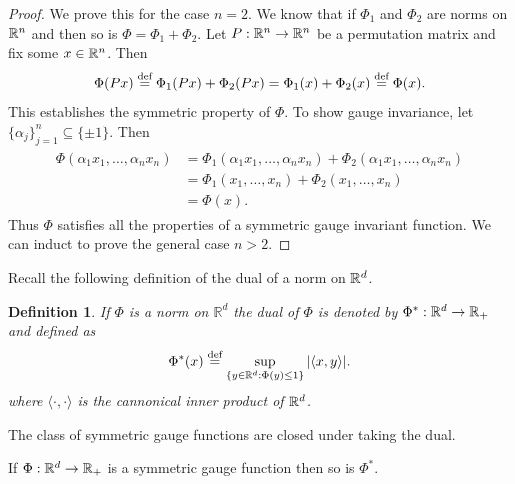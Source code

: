\documentclass[sn-nature]{sn-jnl}%
\theoremstyle{thmstyleone}%
\newtheorem{defn}{Definition}
\theoremstyle{thmstyletwo}%
\theoremstyle{thmstylethree}%
\begin{document}
\begin{proof}
    We prove this for the case $n=2$. We know that if $\Phi_1$ and $\Phi_2$ are norms on $\mathbb{R}^n$ and then so is $\Phi = \Phi_1 + \Phi_2$. Let $P: \mathbb{R}^n \to \mathbb{R}^n$ be a permutation matrix and fix some $x \in \mathbb{R}^n$. Then 
    \[
    \Phi(Px) \stackrel{\text{def}}{=} \Phi_1(Px) + \Phi_2(Px) = \Phi_1(x) + \Phi_2(x) \stackrel{\text{def}}{=} \Phi(x). 
    \]
    This establishes the symmetric property of $\Phi$.
    To show gauge invariance, let $\{\alpha_j\}_{j=1}^n \subseteq \{\pm 1\}$. Then
    \begin{align*}
        \begin{split}
            \Phi(\alpha_1 x_1, \ldots, \alpha_n x_n)  &=  \Phi_1(\alpha_1 x_1, \ldots, \alpha_n x_n) +  \Phi_2(\alpha_1 x_1, \ldots, \alpha_n x_n)
            \\&= \Phi_1(x_1, \ldots, x_n) + \Phi_2(x_1, \ldots, x_n) 
            \\& = \Phi(x).
        \end{split}
    \end{align*}
    Thus $\Phi$ satisfies all the properties of a symmetric gauge invariant function. We can induct to prove the general case $n > 2$.
\end{proof}

Recall the following definition of the dual of a norm on $\mathbb{R}^d$. 


    \begin{defn}
        If $\Phi$ is a norm on $\mathbb{R}^d$ the dual of $\Phi$ is denoted by $\Phi^{*}: \mathbb{R}^d \to \mathbb{R}_+$ and defined as 
        \[
        \Phi^*(x) \stackrel{\text{def}}{=} \sup_{\{y \in \mathbb{R}^d : \Phi(y) \leq 1\}} | \langle x,y \rangle |.
        \]
        where $\langle \cdot, \cdot \rangle$ is the cannonical inner product of $\mathbb{R}^d$.
    \end{defn}


The class of symmetric gauge functions are closed under taking the dual.


    \begin{prop}
        If $\Phi:\mathbb{R}^d \to \mathbb{R}_+$ is a symmetric gauge function then so is $\Phi^*$.
    \end{prop}
\end{document}
